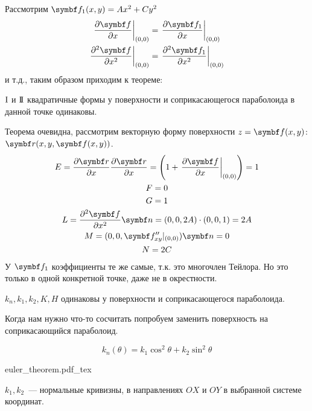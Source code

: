 \documentclass[main]{subfiles}
\begin{document}
Рассмотрим $\vf_1(x,y) = Ax^2 + Cy^2$
\begin{gather*}
    \left.\frac{\partial \vf}{\partial x} \right| _{(0,0)} = \left.\frac{\partial \vf_1}{\partial x} \right|_{(0,0)}\\
    \left.\frac{\partial^2 \vf}{\partial x^2} \right|_{(0,0)} = \left.\frac{\partial^2 \vf_1}{\partial x^2} \right|_{(0,0)}
\end{gather*}
и т.д., таким образом приходим к теореме:
\begin{theorem}
    $\mathrm{I}$ и $\mathrm{I\!I}$ квадратичные формы у поверхности и соприкасающегося параболоида в данной точке одинаковы.
\end{theorem}
Теорема очевидна, рассмотрим векторную форму поверхности $z = \vf(x,y)$: $\vr(x,y,\vf(x,y))$.
\begin{gather*}
    E = \frac{\partial \vr}{\partial x} \frac{\partial \vr}{\partial x} = \left(1 + \left.\frac{\partial \vf}{\partial x} \right|_{(0,0)}\right) = 1\\
    F = 0 \\
    G= 1\\
    L = \frac{\partial^2 \vf}{\partial x^2} \vn = (0,0,2A) \cdot (0,0,1) = 2A\\
    M = (0,0,\vf''_{xy}|_{(0,0)})\vn = 0\\
    N =  2C
\end{gather*}
У $\vf_1$ коэффициенты те же самые, т.к. это многочлен Тейлора.
Но это только в одной конкретной точке, даже не в окрестности.
\begin{corollary}
    $k_{n}, k_1, k_2, K, H$ одинаковы у поверхности и соприкасающегося параболоида.
\end{corollary}

Когда нам нужно что-то сосчитать попробуем заменить поверхность на соприкасающийся параболоид.
\begin{theorem}[Эйлера]
    \[k_{n} (\theta) = k_1 \cos^2 \theta + k_2 \sin^2 \theta\]
\end{theorem}
\begin{center}
    {euler_theorem.pdf_tex}
\end{center}
$k_1, k_2$~--- нормальные кривизны, в направлениях $OX$ и $OY$ в выбранной системе координат.
\end{document}
